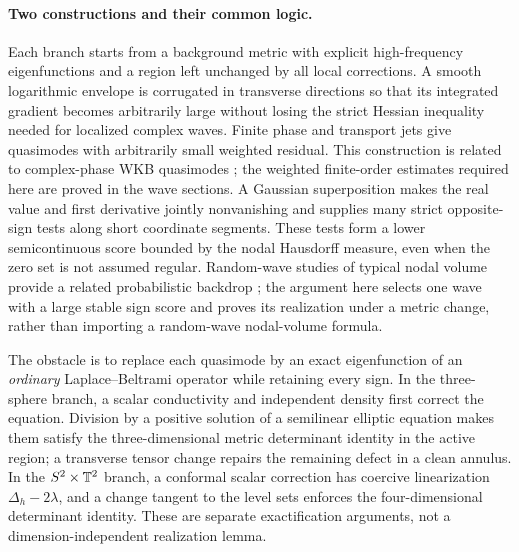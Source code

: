 \paragraph{Two constructions and their common logic.}
Each branch starts from a background metric with explicit high-frequency
eigenfunctions and a region left unchanged by all local corrections.
A smooth logarithmic envelope is corrugated in transverse directions so
that its integrated gradient becomes arbitrarily large without losing
the strict Hessian inequality needed for localized complex waves.
Finite phase and transport jets give quasimodes with arbitrarily small
weighted residual. This construction is related to complex-phase WKB
quasimodes \cite[Section~3]{DenckerSjostrandZworski2004}; the weighted
finite-order estimates required here are proved in the wave sections. A Gaussian superposition makes the real value and
first derivative jointly nonvanishing and supplies many strict
opposite-sign tests along short coordinate segments. These tests form a
lower semicontinuous score bounded by the nodal Hausdorff measure, even
when the zero set is not assumed regular. Random-wave studies of typical
nodal volume provide a related probabilistic backdrop
\cite{RudnickWigman2007,Wigman2008}; the argument here selects one wave
with a large stable sign score and proves its realization under a metric
change, rather than importing a random-wave nodal-volume formula.

The obstacle is to replace each quasimode by an exact eigenfunction of an
\emph{ordinary} Laplace--Beltrami operator while retaining every sign.
In the three-sphere branch, a scalar conductivity and independent density
first correct the equation. Division by a positive solution of a
semilinear elliptic equation makes them satisfy the three-dimensional
metric determinant identity in the active region; a transverse tensor
change repairs the remaining defect in a clean annulus. In the
$S^2\times\mathbb T^2$ branch, a conformal scalar correction has coercive
linearization $\Delta_h-2\lambda$, and a change tangent to the level
sets enforces the four-dimensional determinant identity. These are
separate exactification arguments, not a dimension-independent
realization lemma.

